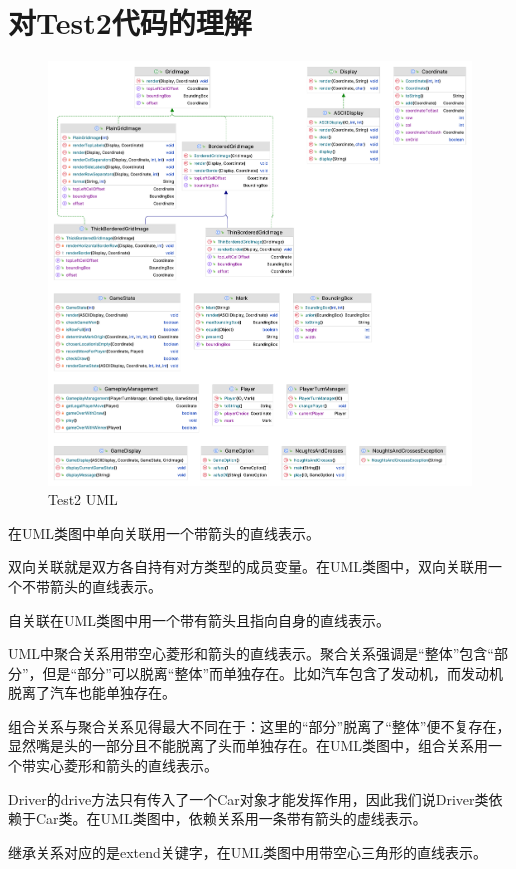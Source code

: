 \section{对Test2代码的理解}

\begin{figure}[h]
    \centering
    \includegraphics[width=18cm]{res/testuml.png}
    \caption{Test2 UML}
\end{figure}

在UML类图中单向关联用一个带箭头的直线表示。

双向关联就是双方各自持有对方类型的成员变量。在UML类图中，双向关联用一个不带箭头的直线表示。

自关联在UML类图中用一个带有箭头且指向自身的直线表示。

UML中聚合关系用带空心菱形和箭头的直线表示。聚合关系强调是“整体”包含“部分”，但是“部分”可以脱离“整体”而单独存在。比如汽车包含了发动机，而发动机脱离了汽车也能单独存在。

组合关系与聚合关系见得最大不同在于：这里的“部分”脱离了“整体”便不复存在，显然嘴是头的一部分且不能脱离了头而单独存在。在UML类图中，组合关系用一个带实心菱形和箭头的直线表示。

Driver的drive方法只有传入了一个Car对象才能发挥作用，因此我们说Driver类依赖于Car类。在UML类图中，依赖关系用一条带有箭头的虚线表示。

继承关系对应的是extend关键字，在UML类图中用带空心三角形的直线表示。

